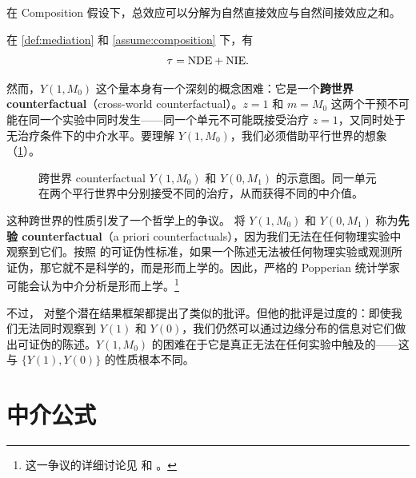 在 Composition 假设下，总效应可以分解为自然直接效应与自然间接效应之和。

\begin{Proposition}[效应的分解]\label{prop:mediation-decomposition}
在 \cref{def:mediation} 和 \cref{assume:composition} 下，有
\[
\tau = \mathrm{NDE} + \mathrm{NIE}.
\]
\end{Proposition}

\fboxsep=5pt\fboxrule=1pt
\noindent{}

然而，$Y(1, M_0)$ 这个量本身有一个深刻的概念困难：它是一个\textbf{跨世界counterfactual}（cross-world counterfactual）。$z=1$ 和 $m=M_0$ 这两个干预不可能在同一个实验中同时发生——同一个单元不可能既接受治疗 $z=1$，又同时处于无治疗条件下的中介水平。要理解 $Y(1, M_0)$，我们必须借助平行世界的想象（\cref{fg:crossworld}）。

\begin{figure}[ht]
\centering
{}
\caption{跨世界 counterfactual $Y(1, M_0)$ 和 $Y(0, M_1)$ 的示意图。同一单元在两个平行世界中分别接受不同的治疗，从而获得不同的中介值。}
\label{fg:crossworld}
\end{figure}

这种跨世界的性质引发了一个哲学上的争议。 将 $Y(1, M_0)$ 和 $Y(0, M_1)$ 称为\textbf{先验 counterfactual}（a priori counterfactuals），因为我们无法在任何物理实验中观察到它们。按照  的可证伪性标准，如果一个陈述无法被任何物理实验或观测所证伪，那它就不是科学的，而是形而上学的。因此，严格的 Popperian 统计学家可能会认为中介分析是形而上学。\footnote{这一争议的详细讨论见 \cite{dawid2000causal} 和 \cite{robins2010treatment}。}

不过， 对整个潜在结果框架都提出了类似的批评。但他的批评是过度的：即使我们无法同时观察到 $Y(1)$ 和 $Y(0)$，我们仍然可以通过边缘分布的信息对它们做出可证伪的陈述。$Y(1, M_0)$ 的困难在于它是真正无法在任何实验中触及的——这与 $\{Y(1), Y(0)\}$ 的性质根本不同。

\section{中介公式}

